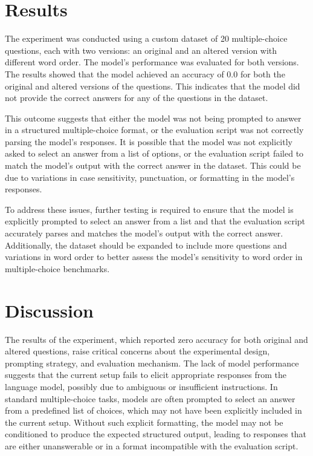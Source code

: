 \documentclass{article}
\begin{document}
\section{Results}

The experiment was conducted using a custom dataset of 20 multiple-choice questions, each with two versions: an original and an altered version with different word order. The model's performance was evaluated for both versions. The results showed that the model achieved an accuracy of 0.0 for both the original and altered versions of the questions. This indicates that the model did not provide the correct answers for any of the questions in the dataset. 

This outcome suggests that either the model was not being prompted to answer in a structured multiple-choice format, or the evaluation script was not correctly parsing the model's responses. It is possible that the model was not explicitly asked to select an answer from a list of options, or the evaluation script failed to match the model's output with the correct answer in the dataset. This could be due to variations in case sensitivity, punctuation, or formatting in the model's responses. 

To address these issues, further testing is required to ensure that the model is explicitly prompted to select an answer from a list and that the evaluation script accurately parses and matches the model's output with the correct answer. Additionally, the dataset should be expanded to include more questions and variations in word order to better assess the model's sensitivity to word order in multiple-choice benchmarks.
\section{Discussion}
The results of the experiment, which reported zero accuracy for both original and altered questions, raise critical concerns about the experimental design, prompting strategy, and evaluation mechanism. The lack of model performance suggests that the current setup fails to elicit appropriate responses from the language model, possibly due to ambiguous or insufficient instructions. In standard multiple-choice tasks, models are often prompted to select an answer from a predefined list of choices, which may not have been explicitly included in the current setup. Without such explicit formatting, the model may not be conditioned to produce the expected structured output, leading to responses that are either unanswerable or in a format incompatible with the evaluation script.
\end{document}
